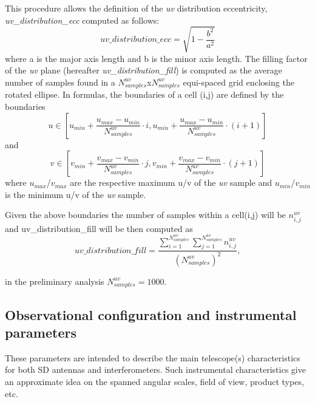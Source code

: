 \documentclass[11pt,a4paper]{ivoa}
\begin{document}
This procedure allows the definition of the \emph{uv} distribution eccentricity, \emph{uv\_distribution\_ecc} computed as follows:
\begin{equation}
uv\_distribution\_ecc = \sqrt{1-\frac{b^2}{a^2}}
\end{equation}
where a is the major axis length and b is the minor axis length.
The filling factor of the \emph{uv} plane (hereafter \emph{uv\_distribution\_fill}) is computed as the average
number of samples found in a $N^{uv}_{samples}$x$N^{uv}_{samples}$ equi-spaced grid enclosing the
rotated ellipse. In formulas, the boundaries of a cell (i,j) are defined by the boundaries
\begin{equation}
u \in [u_{min} + \frac{u_{max} - u_{min}}{N^{uv}_{samples}} \cdot i , u_{min} + \frac{u_{max} -
u_{min}}{N^{uv}_{samples}} \cdot (i + 1)]
\end{equation}
and
\begin{equation}
v \in [v_{min} + \frac{v_{max} - v_{min}}{N^{uv}_{samples}} \cdot j , v_{min} + \frac{v_{max} -
v_{min}}{N^{uv}_{samples}} \cdot (j + 1)]
\end{equation}
where $u_{max}$/$v_{max}$ are the respective maximum u/v of the \emph{uv} sample and
$u_{min}$/$v_{min}$ is the minimum u/v of the \emph{uv} sample.

Given the above boundaries the number of samples within a cell(i,j) will be $n^{uv}_{i,j}$
and uv\_distribution\_fill will be then computed as
\begin{equation}
uv\_distribution\_fill = \frac{\sum^{N^{uv}_{samples}}_{i=1} \sum^{N^{uv}_{samples}}_{j=1}
n^{uv}_{i,j} }{(N^{uv}_{samples}) ^ 2},
\end{equation}

in the preliminary analysis $N^{uv}_{samples} = 1000$.


%

\subsection{Observational configuration and instrumental parameters}
\label{sec:instrumental}
These parameters are intended to describe the main telescope(s) characteristics for both SD antennas and interferometers. 
Such instrumental characteristics give an approximate idea on the spanned angular scales, field of view, product types, etc.
\end{document}
